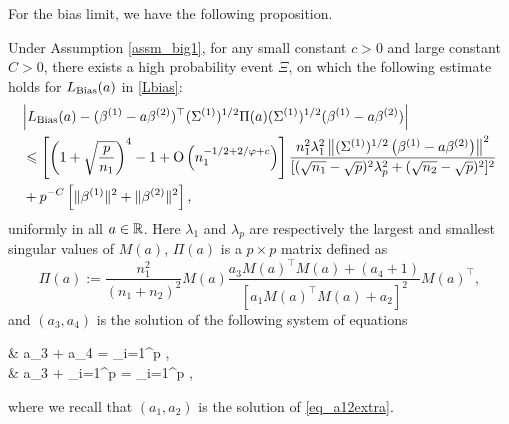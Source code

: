 For the bias limit, we have the following proposition.

\begin{theorem}\label{prop_main_RMT}
Under Assumption \ref{assm_big1}, for any small constant $c>0$ and large constant $C>0$, there exists a high probability event $\Xi$, on which the following estimate  holds for $L_{\textup{Bias}}(a)$ in \eqref{Lbias}:
			\begin{align}
				& \bigabs{ L_{\bias}(a) -   (\beta^{(1)}- a\beta^{(2)} )^\top (\Sigma^{(1)})^{1/2} \Pi(a)(\Sigma^{(1)})^{1/2} (\beta^{(1)}- a\beta^{(2)})   }  \nonumber\\
				& \le \left[\left( 1+\sqrt{\frac{p}{n_1}}\right)^4 - 1 +\OO\left( n_1^{-1/2+2/\varphi + c}\right)\right] \frac{n_1^2 \lambda_1^2 \left\|(\Sigma^{(1)})^{1/2} \left(\beta^{(1)}- a\beta^{(2)}\right) \right\|^2}{  [(\sqrt{n_1}-\sqrt{p})^2 \lambda_p^2+ (\sqrt{n_2}-\sqrt{p})^2]^2}  \nonumber\\
				& + p^{-C} \left[\| \beta^{(1)}\|^2 + \| \beta^{(2)}\|^2 \right], \label{lem_cov_derv_eq}
			\end{align}
				uniformly in all $a\in \mathbb{R}$. Here $\lambda_1$ and $\lambda_p$ are respectively the largest and smallest singular values of $M(a)$, $\Pi(a)$ is a $p\times p$ matrix defined as
				$$\Pi(a):=\frac{n_1^2}{(n_1+n_2)^2}  M(a)  \frac{a_3 M(a)^\top M(a) + (a_4 + 1) }{[a_1 M(a)^\top M(a) + a_2 ]^2} M(a)^\top  ,$$
				 and $(a_{3},a_4)$ is the solution of the following system of equations %
		\be  \label{eq_a34extra}
		\begin{split}
				& a_3 + a_4 = \sum_{i=1}^p , \\
				& a_3 +  \sum_{i=1}^p  =  \sum_{i=1}^p ,
			\end{split}
			\ee
			where we recall that $(a_1,a_2)$ is the solution of \eqref{eq_a12extra}.
\end{theorem}

